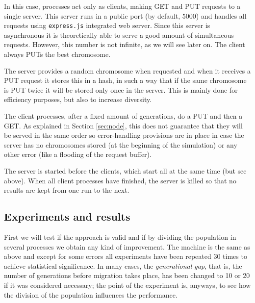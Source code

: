 \documentclass{sig-alternate}
\begin{document}
In this case, processes act only as clients, making GET and PUT
requests to a single server. This server runs in a public port (by
default, 5000) and handles all requests using {\tt express.js} integrated web
server. Since this server is asynchronous it is theoretically able to
serve a good amount of simultaneous requests. However, this number is
not infinite, as we will see later on. The client always PUTs the best
chromosome. 

The server provides a random chromosome when requested and when it
receives a PUT request it stores this in a hash, in such a way that if
the same chromosome is PUT twice it will be stored only once in the
server. This is mainly done for efficiency purposes, but also to increase
diversity. 

The client processes, after a fixed amount of generations, do a PUT
and then a GET. As explained in Section \ref{sec:node}, this does not
guarantee that they will be served in the same order so error-handling
provisions are in place in case the server has no chromosomes stored
(at the beginning of the simulation) or any other error (like a
flooding of the request buffer).

The server is started before the clients, which start all at the same
time (but see above). When all client processes have finished, the
server is killed so that no results are kept from one run to the next.

\subsection{Experiments and results}

First we will test if the approach is valid and if by dividing the
population in several processes we obtain any kind of improvement. The
machine is the same as above and except for some errors all
experiments have been repeated 30 times to achieve statistical
significance. In many cases, the {\em generational gap}, that is, the
number of generations before migration takes place, 
has been changed
to 10 or 20 if it was considered necessary; the point of the
experiment is, anyways, to see how the division of the population
influences the performance. 
\end{document}
